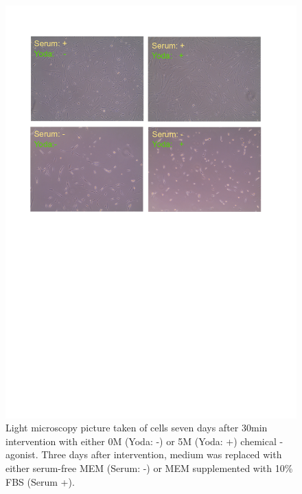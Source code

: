 \begin{figure}[ht]
\centering
\includegraphics[width = \linewidth{}]{LongTerm_CellPicture.png}
\caption{
Light microscopy picture taken of cells seven days after 30min intervention with either  0\textmu{}M (Yoda: -) or 5\textmu{}M (Yoda: +) chemical \Piezo{}-agonist. Three days after intervention, medium was replaced with either serum-free MEM\textalpha{} (Serum: -) or MEM\textalpha{} supplemented with 10\% FBS (Serum +).}
\label{pic:Cells_LongTerm}
\end{figure}


